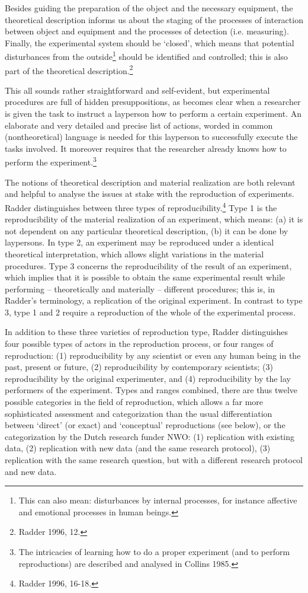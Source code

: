 \documentclass[twocolumn, serif, review, authordate]{jote-article}
\begin{document}
Besides guiding the preparation of the object and the necessary equipment, the theoretical description informs us about the staging of the processes of interaction between object and equipment and the processes of detection (i.e. measuring). Finally, the experimental system should be `closed', which means that potential disturbances from the outside\footnote{ This can also mean: disturbances by internal processes, for instance affective and emotional processes in human beings.} should be identified and controlled; this is also part of the theoretical description.\footnote{ Radder 1996, 12.}

This all sounds rather straightforward and self-evident, but experimental procedures are full of hidden presuppositions, as becomes clear when a researcher is given the task to instruct a layperson how to perform a certain experiment. An elaborate and very detailed and precise list of actions, worded in common (nontheoretical) language is needed for this layperson to successfully execute the tasks involved. It moreover requires that the researcher already knows how to perform the experiment.\footnote{ The intricacies of learning how to do a proper experiment (and to perform reproductions) are described and analysed in Collins 1985.}

The notions of theoretical description and material realization are both relevant and helpful to analyse the issues at stake with the reproduction of experiments. Radder distinguishes between three types of reproducibility.\footnote{ Radder 1996, 16-18.} Type 1 is the reproducibility of the material realization of an experiment, which means: (a) it is not dependent on any particular theoretical description, (b) it can be done by laypersons. In type 2, an experiment may be reproduced under a identical theoretical interpretation, which allows slight variations in the material procedures. Type 3 concerns the reproducibility of the result of an experiment, which implies that it is possible to obtain the same experimental result while performing -- theoretically and materially -- different procedures; this is, in Radder's terminology, a replication of the original experiment. In contrast to type 3, type 1 and 2 require a reproduction of the whole of the experimental process. 

In addition to these three varieties of reproduction type, Radder distinguishes four possible types of actors in the reproduction process, or four ranges of reproduction: (1) reproducibility by any scientist or even any human being in the past, present or future, (2) reproducibility by contemporary scientists; (3) reproducibility by the original experimenter, and (4) reproducibility by the lay performers of the experiment. Types and ranges combined, there are thus twelve possible categories in the field of reproduction, which allows a far more sophisticated assessment and categorization than the usual differentiation between `direct' (or exact) and `conceptual' reproductions (see below), or the categorization by the Dutch research funder NWO: (1) replication with existing data, (2) replication with new data (and the same research protocol), (3) replication with the same research question, but with a different research protocol and new data.
\end{document}
